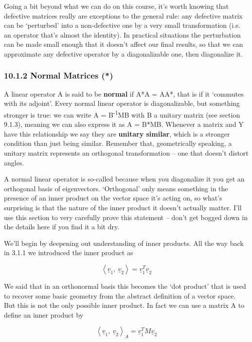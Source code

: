 \documentclass[oneside,english]{amsbook}
\numberwithin{section}{chapter}
\theoremstyle{plain}
\theoremstyle{definition}
\begin{document}
Going a bit beyond what we can do on this course, it's worth knowing
that defective matrices really are exceptions to the general rule: any
defective matrix can be `perturbed' into a non-defective one by a very
small transformation (i.e. an operator that's almost the identity). In
practical situations the perturbation can be made small enough that it
doesn't affect our final results, so that we can approximate any
defective operator by a diagonalizable one, then diagonalize it.

\subsubsection{10.1.2 Normal Matrices (*)}\label{normal-matrices}

A linear operator A is said to be \textbf{normal} if A*A = AA*, that is
if it `commutes with its adjoint'. Every normal linear operator is
diagonalizable, but something stronger is true: we can write A =
B\textsuperscript{-1}MB with B a unitary matrix (see section 9.1.3),
meaning we can also express it as A = B*MB. Whenever a matrix and Y have
this relationship we say they are \textbf{unitary similar}, which is a
stronger condition than just being similar. Remember that, geometrically
speaking, a unitary matrix represents an orthogonal transformation --
one that doesn't distort angles.

A normal linear operator is so-called because when you diagonalize it
you get an orthogonal basis of eigenvectors. `Orthogonal' only means
something in the presence of an inner product on the vector space it's
acting on, so what's surprising is that the nature of the inner product
it doesn't actually matter. I'll use this section to very carefully
prove this statement -- don't get bogged down in the details here if you
find it a bit dry.

We'll begin by deepening out understanding of inner products. All the
way back in 3.1.1 we introduced the inner product as

\[\left\langle {\underline{v}}_{1},\ {\underline{v}}_{2} \right\rangle = {\underline{v}}_{1}^{T}{\underline{v}}_{2}\]

We said that in an orthonormal basis this becomes the `dot product'
that is used to recover some basic geometry from the abstract definition
of a vector space. But this is not the only possible inner product. In
fact we can use a matrix A to define an inner product by

\[\left\langle {\underline{v}}_{1},\ {\underline{v}}_{2} \right\rangle_{A} = {\underline{v}}_{1}^{T}{M\underline{v}}_{2}\]
\end{document}
